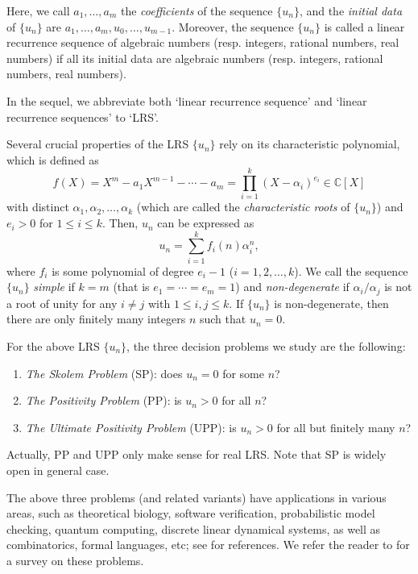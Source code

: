\documentclass[12pt]{amsart}
\theoremstyle{definition}
\theoremstyle{remark}
\numberwithin{equation}{section}
\begin{document}
 Here, we call $a_1,\ldots,a_m$ the \textit{coefficients} of the sequence $\{u_n\}$, and the \textit{initial data} of $\{u_n\}$ are $a_1,\ldots,a_m,u_0,\ldots,u_{m-1}$. Moreover, the sequence $\{u_n\}$ is called a linear recurrence sequence of algebraic numbers (resp. integers, rational numbers, real numbers) if all its initial data are algebraic numbers (resp. integers, rational numbers, real numbers). 

 In the sequel, we abbreviate both `linear recurrence sequence' and `linear recurrence sequences' to `LRS'.

Several crucial properties of the LRS $\{u_n\}$ rely on its 
 characteristic polynomial, which is defined as 
\begin{equation}
\label{polynomial}
f(X)=X^m-a_1X^{m-1}-\cdots-a_m=\prod_{i=1}^{k}(X-\alpha_i)^{e_i}  \in {{\mathbb C}}[X]
\end{equation}
with distinct $\alpha_1,\alpha_2,\ldots,\alpha_k$ (which are called the  \textit{characteristic roots} of $\{u_n\}$) and $e_i>0$ for $1\le i \le k$. Then, $u_n$ can be expressed as
\begin{equation}
\label{expression}
u_n=\sum_{i=1}^{k}f_i(n)\alpha_i^n,
\end{equation}
where $f_i$ is some polynomial of degree $e_i-1$ ($i=1,2,\ldots,k$). We call the sequence $\{u_n\}$ \textit{simple} if $k=m$ (that is $e_1=\cdots=e_m=1$) and \textit{non-degenerate} if $\alpha_i/\alpha_j$ is not a root of unity for any $i\ne j$ with $1\le i,j\le k$. 
If $\{u_n\}$ is non-degenerate, then there are only finitely many integers $n$ such that $u_n=0$.

For the above LRS $\{u_n\}$, the three decision problems we study are the following:

\begin{enumerate}[\quad 1.]
\item \textit{The Skolem Problem} (SP): does $u_n=0$ for some $n$? \label{problem1}

\item \textit{The Positivity Problem} (PP): is $u_n>0$ for all $n$? \label{problem2}

\item \textit{The Ultimate Positivity Problem} (UPP): is $u_n> 0$ for all but finitely many $n$? \label{problem3}
\end{enumerate}
Actually, PP and UPP only make sense for real LRS. Note that SP is widely open in general case. 

The above three problems (and related variants) have applications in various areas, such as theoretical biology, software verification, probabilistic
model checking, quantum
computing, discrete linear dynamical systems,
as well as combinatorics, formal languages, etc;  see \cite{OW14a} for references. We refer the reader to \cite{OW12} for a survey on these problems.
\end{document}
